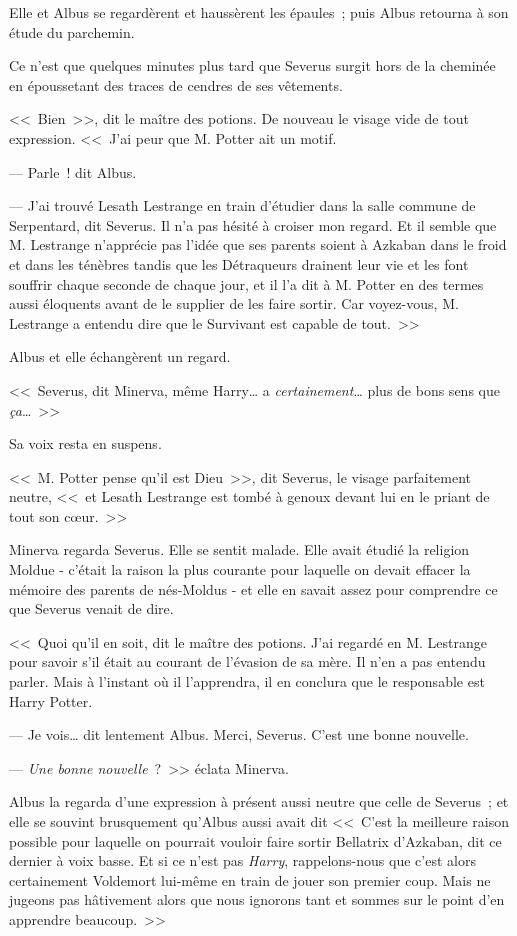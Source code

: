 Elle et Albus se regardèrent et haussèrent les épaules~; puis Albus retourna à son étude du parchemin.

Ce n'est que quelques minutes plus tard que Severus surgit hors de la cheminée en époussetant des traces de cendres de ses vêtements.

<<~Bien~>>, dit le maître des potions. De nouveau le visage vide de tout expression. <<~J'ai peur que M. Potter ait un motif.

--- Parle~! dit Albus.

--- J'ai trouvé Lesath Lestrange en train d'étudier dans la salle commune de Serpentard, dit Severus. Il n'a pas hésité à croiser mon regard. Et il semble que M. Lestrange n'apprécie pas l'idée que ses parents soient à Azkaban dans le froid et dans les ténèbres tandis que les Détraqueurs drainent leur vie et les font souffrir chaque seconde de chaque jour, et il l'a dit à M. Potter en des termes aussi éloquents avant de le supplier de les faire sortir. Car voyez-vous, M. Lestrange a entendu dire que le Survivant est capable de tout.~>>

Albus et elle échangèrent un regard.

<<~Severus, dit Minerva, même Harry… a \emph{certainement}… plus de bons sens que \emph{ça}…~>>

Sa voix resta en suspens.

<<~M. Potter pense qu'il est Dieu~>>, dit Severus, le visage parfaitement neutre, <<~et Lesath Lestrange est tombé à genoux devant lui en le priant de tout son cœur.~>>

Minerva regarda Severus. Elle se sentit malade. Elle avait étudié la religion Moldue - c'était la raison la plus courante pour laquelle on devait effacer la mémoire des parents de nés-Moldus - et elle en savait assez pour comprendre ce que Severus venait de dire.

<<~Quoi qu'il en soit, dit le maître des potions. J'ai regardé en M. Lestrange pour savoir s'il était au courant de l'évasion de sa mère. Il n'en a pas entendu parler. Mais à l'instant où il l'apprendra, il en conclura que le responsable est Harry Potter.

--- Je vois… dit lentement Albus. Merci, Severus. C'est une bonne nouvelle.

--- \emph{Une bonne nouvelle}~?~>> éclata Minerva.

Albus la regarda d'une expression à présent aussi neutre que celle de Severus~; et elle se souvint brusquement qu'Albus aussi avait dit <<~C'est la meilleure raison possible pour laquelle on pourrait vouloir faire sortir Bellatrix d'Azkaban, dit ce dernier à voix basse. Et si ce n'est pas \emph{Harry}, rappelons-nous que c'est alors certainement Voldemort lui-même en train de jouer son premier coup. Mais ne jugeons pas hâtivement alors que nous ignorons tant et sommes sur le point d'en apprendre beaucoup.~>>

